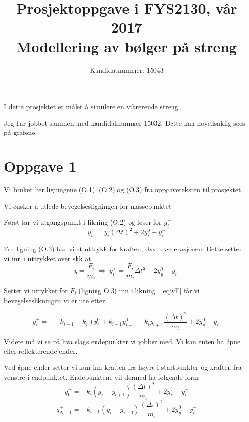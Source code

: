 \documentclass[norsk,a4,12pt,fleqn]{extarticle}
\title{Prosjektoppgave i FYS2130, vår 2017 \\[1em]
    \Large Modellering av bølger på streng\\[2em]}
\author{Kandidatnummer: 15043}
\begin{document}
\maketitle

I dette prosjektet er målet å simulere en vibrerende streng.

Jeg har jobbet sammen med kandidatnummer 15032.
Dette kan hovedsaklig sees på grafene.

\section*{Oppgave 1}

Vi bruker her ligningene (O.1), (O.2) og (O.3) fra oppgaveteksten til prosjektet.

Vi ønsker å utlede bevegelsesligningen for massepunktet 

Først tar vi utgangspunkt i likning (O.2) og løser for $y_i^+$. 
\begin{equation*}
    y_i^+ = \ddot{y_i}(\Delta t)^2 + 2 y_i^0 - y_i^- 
\end{equation*}

Fra ligning (O.3) har vi et uttrykk for kraften, dvs. akselerasjonen.
Dette setter vi inn i uttrykket over slik at
\begin{equation}\label{eq:yF}
    \ddot{y} = \frac{F_i}{m_i} \ \Rightarrow \ y_i^+ = \frac{F_i}{m_i}\Delta t^2 + 2y_y^0 - y_i^-
\end{equation}

Setter vi utrykket for \(F_i\) (ligning O.3) inn i likning ~\ref{eq:yF} 
får vi bevegelseslikningen vi er ute etter. 

\begin{equation}\label{eq:y}
    y_i^+ =  -(k_{i-1} + k_i)y_i^0 + k_{i-1}y_{i-1}^0 + k_iy_{i+1}\frac{(\Delta t)^2}{m_i} + 2y_y^0 - y_i^-
\end{equation}


Videre må vi se på hva slags endepunkter vi jobber med. Vi kan enten ha åpne 
eller reflekterende ender. 

Ved åpne ender setter vi kun inn kraften fra høyre i startpunkter og kraften fra venstre i endpunktet. 
Endepunktene vil dermed ha følgende form
\begin{equation*}
    y_0^+ =  -k_i(y_i - y_{i+1})\frac{(\Delta t)^2}{m_i} + 2y_y^0 - y_i^-
\end{equation*} 
\begin{equation*}
    y_{N-1}^+ =  -k_{i-1}(y_i - y_{i-1})\frac{(\Delta t)^2}{m_i} + 2y_y^0 - y_i^-
\end{equation*} 
\end{document}
